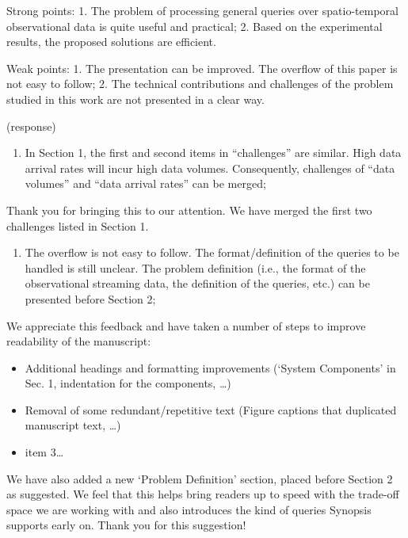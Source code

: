 \documentclass{article}
\begin{document}
Strong points: 1. The problem of processing general queries over
spatio-temporal observational data is quite useful and practical; 2.
Based on the experimental results, the proposed solutions are efficient.

Weak points: 1. The presentation can be improved. The overflow of this
paper is not easy to follow; 2. The technical contributions and
challenges of the problem studied in this work are not presented in a
clear way.

\begin{tcolorbox}
(response)
\end{tcolorbox}

\begin{enumerate}
\def\labelenumi{(\arabic{enumi})}
\item
  In Section 1, the first and second items in ``challenges'' are
  similar. High data arrival rates will incur high data volumes.
  Consequently, challenges of ``data volumes'' and ``data arrival
  rates'' can be merged;
\end{enumerate}

\begin{tcolorbox}
Thank you for bringing this to our attention. We have merged the first
two challenges listed in Section 1.
\end{tcolorbox}

\begin{enumerate}
\def\labelenumi{(\arabic{enumi})}
\setcounter{enumi}{1}
\item
  The overflow is not easy to follow. The format/definition of the
  queries to be handled is still unclear. The problem definition (i.e.,
  the format of the observational streaming data, the definition of the
  queries, etc.) can be presented before Section 2;
\end{enumerate}

\begin{tcolorbox}
We appreciate this feedback and have taken a number of steps to improve
readability of the manuscript:

\begin{itemize}
\item
  Additional headings and formatting improvements (`System Components'
  in Sec. 1, indentation for the components, \ldots{})
\item
  Removal of some redundant/repetitive text (Figure captions that
  duplicated manuscript text, \ldots{})
\item
  item 3\ldots{}
\end{itemize}

We have also added a new `Problem Definition' section, placed before
Section 2 as suggested. We feel that this helps bring readers up to
speed with the trade-off space we are working with and also introduces
the kind of queries Synopsis supports early on. Thank you for this
suggestion!
\end{tcolorbox}
\end{document}
